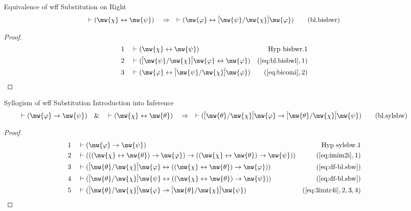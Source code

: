 \begin{lemma} Equivalence of wff Substitution on Right
\begin{align}
\vdash ( \mw{\chi} \leftrightarrow \mw{\psi} )\quad\Rightarrow\quad \vdash (
    \mw{\varphi} \leftrightarrow \overline{[} \mw{\psi} / \mw{\chi}
    \overline{]} \mw{\varphi} )\label{eq:bl.bisbwr}\tag{bl.bisbwr}
\end{align}
\end{lemma}

\begin{proof}
\begin{align}
  1 &&  & \vdash ( \mw{\chi} \leftrightarrow \mw{\psi} )&\text{Hyp~bisbwr.1}\notag%
  \\ 2 &&  & \vdash ( \overline{[} \mw{\psi} / \mw{\chi} \overline{]} \mw{\varphi} \leftrightarrow \mw{\varphi} )&(\mbox{\ref{eq:bl.bisbwl}},1)\notag
  \\ 3 &&  & \vdash ( \mw{\varphi} \leftrightarrow \overline{[} \mw{\psi} / \mw{\chi} \overline{]} \mw{\varphi} )&(\mbox{\ref{eq:bicomi}},2)\notag
\end{align}
\end{proof}

\begin{lemma} Syllogism of wff Substitution
Introduction into Inference
\begin{align}
\vdash ( \mw{\varphi} \rightarrow \mw{\psi} )\quad\&\quad \vdash ( \mw{\chi}
    \leftrightarrow \mw{\theta} )\quad\Rightarrow\quad \vdash ( \overline{[}
    \mw{\theta} / \mw{\chi} \overline{]} \mw{\varphi} \rightarrow \overline{[}
    \mw{\theta} / \mw{\chi} \overline{]} \mw{\psi}
    )\label{eq:bl.sylsbw}\tag{bl.sylsbw}
\end{align}
\end{lemma}

\begin{proof}
\begin{align}
  1 &&  & \vdash ( \mw{\varphi} \rightarrow \mw{\psi} )&\text{Hyp~sylsbw.1}\notag%
  \\ 2 &&  & \vdash ( ( ( \mw{\chi} \leftrightarrow \mw{\theta} ) \rightarrow \mw{\varphi} ) \rightarrow ( ( \mw{\chi} \leftrightarrow \mw{\theta} ) \rightarrow \mw{\psi} ) )&(\mbox{\ref{eq:imim2i}},1)\notag
  \\ 3 &&  & \vdash ( \overline{[} \mw{\theta} / \mw{\chi} \overline{]} \mw{\varphi} \leftrightarrow ( ( \mw{\chi} \leftrightarrow \mw{\theta} ) \rightarrow \mw{\varphi} ) )&(\mbox{\ref{eq:df-bl.sbw}})\notag
  \\ 4 &&  & \vdash ( \overline{[} \mw{\theta} / \mw{\chi} \overline{]} \mw{\psi} \leftrightarrow ( ( \mw{\chi} \leftrightarrow \mw{\theta} ) \rightarrow \mw{\psi} ) )&(\mbox{\ref{eq:df-bl.sbw}})\notag
  \\ 5 &&  & \vdash ( \overline{[} \mw{\theta} / \mw{\chi} \overline{]} \mw{\varphi} \rightarrow \overline{[} \mw{\theta} / \mw{\chi} \overline{]} \mw{\psi} )&(\mbox{\ref{eq:3imtr4i}},2,3,4)\notag
\end{align}
\end{proof}

